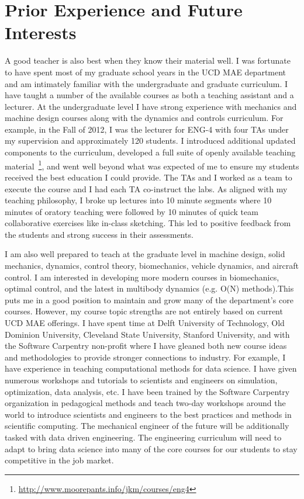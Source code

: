 \documentclass{article}
\begin{document}
\section*{Prior Experience and Future Interests}
%
A good teacher is also best when they know their material well. I was fortunate
to have spent most of my graduate school years in the UCD MAE department and am
intimately familiar with the undergraduate and graduate curriculum. I have
taught a number of the available courses as both a teaching assistant and a
lecturer. At the undergraduate level I have strong experience with mechanics
and machine design courses along with the dynamics and controls curriculum. For
example, in the Fall of 2012, I was the lecturer for ENG-4 with four TAs under
my supervision and approximately 120 students. I introduced additional updated
components to the curriculum, developed a full suite of openly available
teaching
material~\footnote{\url{http://www.moorepants.info/jkm/courses/eng4}}, and
went well beyond what was expected of me to ensure my students received the
best education I could provide. The TAs and I worked as a team to execute the
course and I had each TA co-instruct the labs. As aligned with my teaching
philosophy, I broke up lectures into 10 minute segments where 10 minutes of
oratory teaching were followed by 10 minutes of quick team collaborative
exercises like in-class sketching. This led to positive feedback from the
students and strong success in their assessments.

I am also well prepared to teach at the graduate level in machine design, solid
mechanics, dynamics, control theory, biomechanics, vehicle dynamics, and
aircraft control. I am interested in developing more modern courses in
biomechanics, optimal control, and the latest in multibody dynamics (e.g. O(N)
methods).This puts me in a good position to maintain and grow many of the
department's core courses. However, my course topic strengths are not entirely
based on current UCD MAE offerings. I have spent time at Delft University of
Technology, Old Dominion University, Cleveland State University, Stanford
University, and with the Software Carpentry non-profit where I have gleaned
both new course ideas and methodologies to provide stronger connections to
industry. For example, I have experience in teaching computational methods for
data science. I have given numerous workshops and tutorials to scientists and
engineers on simulation, optimization, data analysis, etc. I have been trained
by the Software Carpentry organization in pedagogical methods and teach two-day
workshops around the world to introduce scientists and engineers to the best
practices and methods in scientific computing. The mechanical engineer of the
future will be additionally tasked with data driven engineering. The
engineering curriculum will need to adapt to bring data science into many of
the core courses for our students to stay competitive in the job market.
\end{document}
